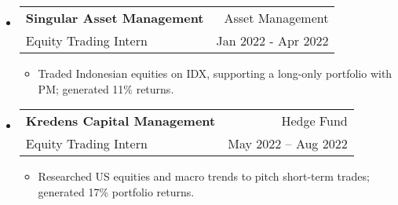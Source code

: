 \documentclass[letterpaper, 11pt]{article}
\makeatletter
\def\sectionlineskip{\medskip}
\def\sectionskip{\medskip}
\newcommand{\SectionHeading}[1]{
  \sectionskip
  \raggedright\raggedbottom\MakeUppercase{\large{#1}}
  \sectionlineskip
  \hrule
  \color{black}
}
\newcommand{\ResumeEntryTSDL}[4]{
  \vspace{1pt}\item
    \begin{tabular*}{\textwidth}[t]{l@{\extracolsep{\fill}}r} 
      \textbf{#1} & #2 \\
      #3 & #4 \\
    \end{tabular*}\vspace{-2.835pt} %
}
\newcommand{\ResumeItemDefault}[1]{
  \item{
    #1 \vspace{-2.835pt}
  }
}
\newcommand{\ResumeEntryStart}{\begin{itemize}[leftmargin=0mm, label={}]}
\newcommand{\ResumeEntryEnd}{\end{itemize}\vspace{-2.835pt}} %
\newcommand{\ResumeItemListStart}{\begin{itemize}[leftmargin=5mm, label=$\bullet$, itemsep=1mm, parsep=1mm]} %
\newcommand{\ResumeItemListEnd}{\end{itemize}}
\newcommand{\OpenSourceProjectItem}[3]{
  \item{
    \href{#1}{\textbf{#2} }\hfill{#3}\vspace{-2.835pt}
  }
}
\makeatother
\begin{document}


  \ResumeEntryStart
    \ResumeEntryTSDL{Singular Asset Management}{Asset Management}{Equity Trading Intern}{Jan 2022 - Apr 2022}
    \ResumeItemListStart
      \ResumeItemDefault{Traded Indonesian equities on IDX, supporting a long-only portfolio with PM; generated 11\% returns.}
    \ResumeItemListEnd
  \ResumeEntryEnd

  \ResumeEntryStart
  \ResumeEntryTSDL{Kredens Capital Management}{Hedge Fund}{Equity Trading Intern}{May 2022 – Aug 2022}
    \ResumeItemListStart
      \ResumeItemDefault{Researched US equities and macro trends to pitch short-term trades; generated 17\% portfolio returns.}
    \ResumeItemListEnd
  \ResumeEntryEnd
\end{document}
